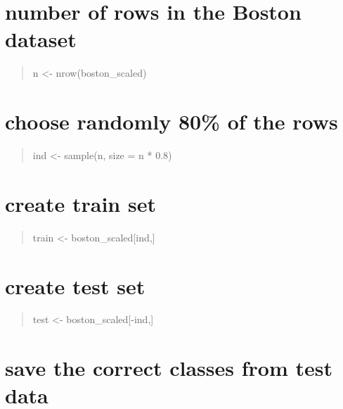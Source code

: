 \documentclass[]{article}
\begin{document}
\section{number of rows in the Boston
dataset}\label{number-of-rows-in-the-boston-dataset}

\begin{quote}
n \textless{}- nrow(boston\_scaled)
\end{quote}

\begin{quote}
\end{quote}

\section{choose randomly 80\% of the
rows}\label{choose-randomly-80-of-the-rows}

\begin{quote}
ind \textless{}- sample(n, size = n * 0.8)
\end{quote}

\begin{quote}
\end{quote}

\section{create train set}\label{create-train-set}

\begin{quote}
train \textless{}- boston\_scaled{[}ind,{]}
\end{quote}

\begin{quote}
\end{quote}

\section{create test set}\label{create-test-set}

\begin{quote}
test \textless{}- boston\_scaled{[}-ind,{]}
\end{quote}

\begin{quote}
\end{quote}

\section{save the correct classes from test
data}\label{save-the-correct-classes-from-test-data}
\end{document}
